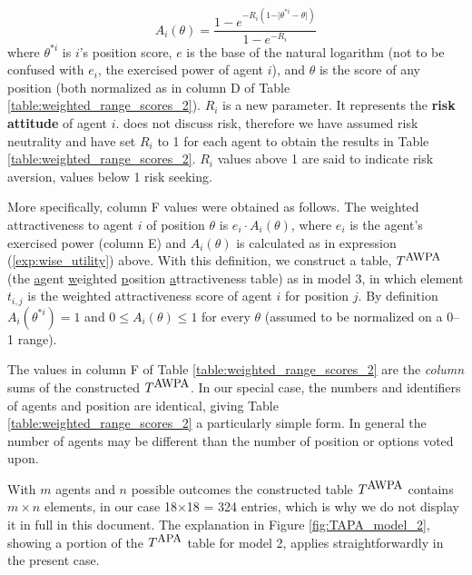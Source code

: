 \begin{enumerate}
\begin{equation}
A_i(\theta) = \frac{1 - e^{-R_i(1-\vert \theta^{*i} - \theta\vert)}}{1 - e^{-R_i}} \label{exp:wise_utility}%
\end{equation}
 where $\theta^{*i}$ is $i$'s   {position} score, $e$ is the base of the natural logarithm (not to be confused with $e_i$, the   {exercised power} of agent $i$), and $\theta$ is the score of any   {position} (both normalized as in column D of Table \ref{table:weighted_range_scores_2}). $R_i$ is a new parameter. It represents the {\bf  {risk attitude}} of agent $i$. \cite{mesquita_1984} does not discuss risk, therefore we have assumed risk neutrality and have  set $R_i$ to 1 for each agent to obtain the results in Table \ref{table:weighted_range_scores_2}.  $R_i$ values above 1 are said to indicate risk aversion, values below 1 risk seeking. %

 
 More specifically, column F values were obtained as follows.  The weighted   {attractiveness} to agent $i$ of   {position} $\theta$ is  $e_i\cdot A_i(\theta)$,  where $e_i$ is the agent's   {exercised power} (column E) and $A_i(\theta)$ is calculated as in expression (\ref{exp:wise_utility}) above. %
 With this definition, we construct a table, $T^{\mbox{\small AWPA}}$ (the \underline{a}gent \underline{w}eighted \underline{p}osition \underline{a}ttractiveness table) as in model 3,  in which element $t_{i,j}$ is the weighted   {attractiveness}  score of agent $i$ for   {position} $j$.  By definition $A_i(\theta^{*i}) = 1$ and $0 \le A_i(\theta) \le 1$ for every $\theta$ (assumed to be normalized on a 0--1 range).

The values in column F of Table \ref{table:weighted_range_scores_2} are  the \emph{column} sums of the constructed $T^{\mbox{\small AWPA}}$.  In our special case, the numbers and identifiers of agents and   {position} are identical, giving Table \ref{table:weighted_range_scores_2} a particularly simple form. In general the number of agents may be different than the number of   {position} or options voted upon.

 
With $m$ agents and $n$ possible outcomes the constructed table $T^{\mbox{\small AWPA}}$  contains $m\times n$ elements, in our case 18$\times$18 = 324 entries, which is why we do not display it in full in this document. The explanation in Figure \ref{fig:TAPA_model_2}, showing a portion of the $T^{\mbox{\small APA}}$  table for model 2, applies straightforwardly in the present case.


\end{enumerate}
